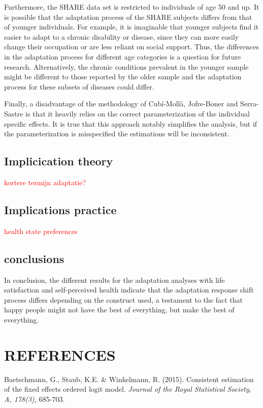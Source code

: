 \documentclass[12pt]{article}
\begin{document}
Furthermore, the SHARE data set is restricted to individuals of age 50 and up. It is possible that the adaptation process of the SHARE subjects differs from that of younger individuals. For example, it is imaginable that younger subjects find it easier to adapt to a chronic disability or disease, since they can more easily change their occupation or are less reliant on social support. Thus, the differences in the adaptation process for different age categories is a question for future research. Alternatively, the chronic conditions prevalent in the younger sample might be different to those reported by the older sample and the adaptation process for these subsets of diseases could differ.

Finally, a disadvantage of the methodology of Cub\'i-Moll\`a, Jofre-Boner and Serra-Sastre is that it heavily relies on the correct parameterization of the individual specific effects. It is true that this approach notably simplifies the analysis, but if the parameterization is misspecified the estimations will be inconsistent. 

\subsection{Implicication theory}
\textcolor{red}{kortere termijn adaptatie?}
\subsection{Implications practice}
\textcolor{red}{health state preferences}
\subsection{conclusions}
In conclusion, the different results for the adaptation analyses with life satisfaction and self-perceived health indicate that the adaptation response shift process differs depending on the construct used, a testament to the fact that happy people might not have the best of everything, but make the best of everything. 

\section*{\centering REFERENCES}

\noindent Baetschmann, G., Staub, K.E. \& Winkelmann, R. (2015). Consistent estimation of the fixed effects ordered logit model. \textit{Journal of the Royal Statistical Society, A, 178(3),} 685-703.\\
\end{document}
